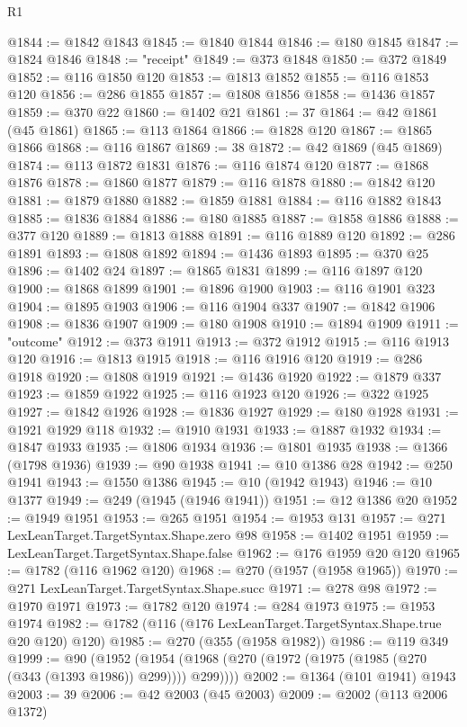 \begin{lexlean}{R1}
\begin{coremodule}
@1844 := @1842 @1843
@1845 := @1840 @1844
@1846 := @180 @1845
@1847 := @1824 @1846
@1848 := "receipt"
@1849 := @373 @1848
@1850 := @372 @1849
@1852 := @116 @1850 @120
@1853 := @1813 @1852
@1855 := @116 @1853 @120
@1856 := @286 @1855
@1857 := @1808 @1856
@1858 := @1436 @1857
@1859 := @370 @22
@1860 := @1402 @21
@1861 := 37
@1864 := @42 @1861 (@45 @1861)
@1865 := @113 @1864
@1866 := @1828 @120
@1867 := @1865 @1866
@1868 := @116 @1867
@1869 := 38
@1872 := @42 @1869 (@45 @1869)
@1874 := @113 @1872 @1831
@1876 := @116 @1874 @120
@1877 := @1868 @1876
@1878 := @1860 @1877
@1879 := @116 @1878
@1880 := @1842 @120
@1881 := @1879 @1880
@1882 := @1859 @1881
@1884 := @116 @1882 @1843
@1885 := @1836 @1884
@1886 := @180 @1885
@1887 := @1858 @1886
@1888 := @377 @120
@1889 := @1813 @1888
@1891 := @116 @1889 @120
@1892 := @286 @1891
@1893 := @1808 @1892
@1894 := @1436 @1893
@1895 := @370 @25
@1896 := @1402 @24
@1897 := @1865 @1831
@1899 := @116 @1897 @120
@1900 := @1868 @1899
@1901 := @1896 @1900
@1903 := @116 @1901 @323
@1904 := @1895 @1903
@1906 := @116 @1904 @337
@1907 := @1842 @1906
@1908 := @1836 @1907
@1909 := @180 @1908
@1910 := @1894 @1909
@1911 := "outcome"
@1912 := @373 @1911
@1913 := @372 @1912
@1915 := @116 @1913 @120
@1916 := @1813 @1915
@1918 := @116 @1916 @120
@1919 := @286 @1918
@1920 := @1808 @1919
@1921 := @1436 @1920
@1922 := @1879 @337
@1923 := @1859 @1922
@1925 := @116 @1923 @120
@1926 := @322 @1925
@1927 := @1842 @1926
@1928 := @1836 @1927
@1929 := @180 @1928
@1931 := @1921 @1929 @118
@1932 := @1910 @1931
@1933 := @1887 @1932
@1934 := @1847 @1933
@1935 := @1806 @1934
@1936 := @1801 @1935
@1938 := @1366 (@1798 @1936)
@1939 := @90 @1938
@1941 := @10 @1386 @28
@1942 := @250 @1941
@1943 := @1550 @1386
@1945 := @10 (@1942 @1943)
@1946 := @10 @1377
@1949 := @249 (@1945 (@1946 @1941))
@1951 := @12 @1386 @20
@1952 := @1949 @1951
@1953 := @265 @1951
@1954 := @1953 @131
@1957 := @271 LexLeanTarget.TargetSyntax.Shape.zero @98
@1958 := @1402 @1951
@1959 := LexLeanTarget.TargetSyntax.Shape.false
@1962 := @176 @1959 @20 @120
@1965 := @1782 (@116 @1962 @120)
@1968 := @270 (@1957 (@1958 @1965))
@1970 := @271 LexLeanTarget.TargetSyntax.Shape.succ
@1971 := @278 @98
@1972 := @1970 @1971
@1973 := @1782 @120
@1974 := @284 @1973
@1975 := @1953 @1974
@1982 := @1782 (@116 (@176 LexLeanTarget.TargetSyntax.Shape.true @20 @120) @120)
@1985 := @270 (@355 (@1958 @1982))
@1986 := @119 @349
@1999 := @90
    (@1952 (@1954 (@1968 (@270 (@1972 (@1975 (@1985 (@270 (@343 (@1393 @1986)) @299)))) @299))))
@2002 := @1364 (@101 @1941) @1943
@2003 := 39
@2006 := @42 @2003 (@45 @2003)
@2009 := @2002 (@113 @2006 @1372)

\end{coremodule}
\end{lexlean}
